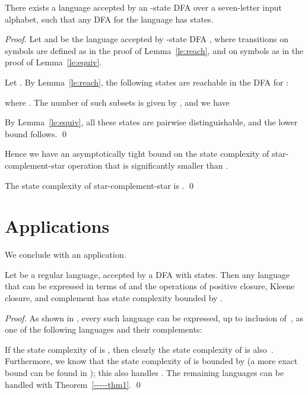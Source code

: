 \documentclass[runningheads]{llncs}
\begin{document}
\begin{corollary}\label{-----co2}
 There exists a language  
 accepted by an -state DFA  over a seven-letter input alphabet,
 such that any DFA for the language  
 has   states.
\end{corollary}

\begin{proof}
 Let 
  and
  be the language 
 accepted by -state DFA ,
 where transitions on symbols  
 are defined as in the proof of Lemma~\ref{le:reach},
 and on symbols  as in the proof of Lemma~\ref{le:equiv}.

 Let .
 By Lemma~\ref{le:reach},
 the following states
 are reachable in the DFA     
 for :
 
 where 
 .
 The number of such subsets  is given by , and we have
 
 By Lemma~\ref{le:equiv}, all these states are pairwise distinguishable,
 and the lower bound follows. 
\qed
\end{proof}

Hence we have an asymptotically tight bound on the state complexity of
star-complement-star operation that is significantly smaller than
.

\begin{theorem}\label{-----thm1}
 The state complexity of star-complement-star is .
\qed
\end{theorem}

\section{Applications}
\label{***applications}

We conclude with an application.

\begin{corollary}
Let  be a regular language, accepted by a DFA with  states.  Then
any language that can be expressed in terms of  and the operations
of positive closure, Kleene closure, and complement has state complexity
bounded by .
\end{corollary}

\begin{proof}
As shown in \cite{BGS}, every such language
can be expressed, up to inclusion of~,
as one of the following  languages and their complements:

If the state complexity of  is , then
clearly the state complexity of  is also~.  Furthermore,
we know that the state complexity of  is bounded by
 (a more exact bound can be found in \cite{yzs94}); this
also handles .
The remaining languages can be handled with Theorem~\ref{-----thm1}.
\qed
\end{proof}
\end{document}
